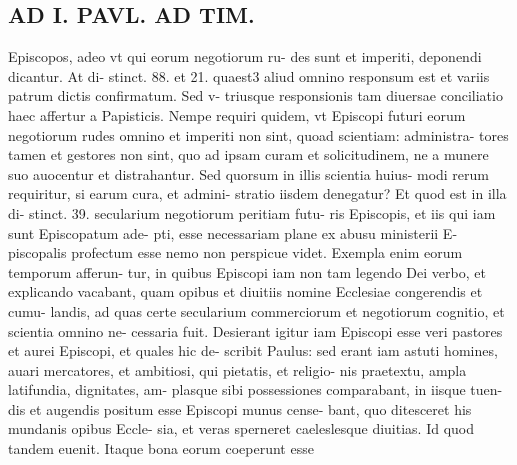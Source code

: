 \documentclass{article}
\begin{document}
\begin{pages}
\section*{AD I. PAVL. AD TIM. }
\marginpar{[ p.152 ]}\pstart Episcopos, adeo vt qui eorum negotiorum ru- des sunt et imperiti, deponendi dicantur. At di- stinct. 88. et 21. quaest3 aliud omnino responsum est et variis patrum dictis confirmatum. Sed v- triusque responsionis tam diuersae conciliatio haec affertur a Papisticis. Nempe requiri quidem, vt Episcopi futuri eorum negotiorum rudes omnino et imperiti non sint, quoad scientiam: administra- tores tamen et gestores non sint, quo ad ipsam curam et solicitudinem, ne a munere suo auocentur et distrahantur. Sed quorsum in illis scientia huius- modi rerum requiritur, si earum cura, et admini- stratio iisdem denegatur? Et quod est in illa di- stinct. 39. secularium negotiorum peritiam futu- ris Episcopis, et iis qui iam sunt Episcopatum ade- pti, esse necessariam plane ex abusu ministerii E- piscopalis profectum esse nemo non perspicue videt. Exempla enim eorum temporum afferun- tur, in quibus Episcopi iam non tam legendo Dei verbo, et explicando vacabant, quam opibus et diuitiis nomine Ecclesiae congerendis et cumu- landis, ad quas certe secularium commerciorum et negotiorum cognitio, et scientia omnino ne- cessaria fuit. Desierant igitur iam Episcopi esse veri pastores et aurei Episcopi, et quales hic de- scribit Paulus: sed erant iam astuti homines, auari mercatores, et ambitiosi, qui pietatis, et religio- nis praetextu, ampla latifundia, dignitates, am- plasque  sibi possessiones comparabant, in iisque tuen- dis et augendis positum esse Episcopi munus cense- bant, quo ditesceret his mundanis opibus Eccle- sia, et veras sperneret caeleslesque  diuitias. Id quod tandem euenit. Itaque bona eorum coeperunt esse  \pend

\end{pages}
\end{document}
